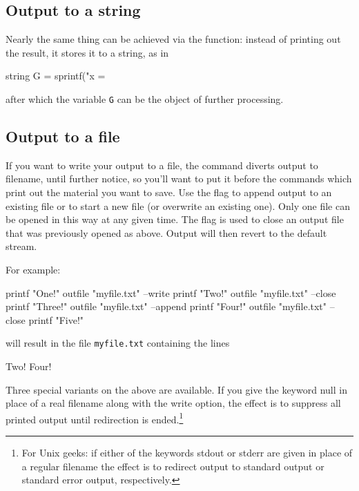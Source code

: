 \subsection{Output to a string}
\label{sec:sprintf}

Nearly the same thing can be achieved via the  function:
instead of printing out the result, it stores it to a string, as in 
\begin{code}
  string G = sprintf("x = %
\end{code}
after which the variable \texttt{G} can be the object of further
processing.


\subsection{Output to a file}
\label{sec:outfile}

If you want to write your output to a file, the  command
diverts output to filename, until further notice, so you'll want to
put it before the commands which print out the material you want to
save. Use the flag  to append output to an existing
file or  to start a new file (or overwrite an existing
one). Only one file can be opened in this way at any given time. The
 flag is used to close an output file that was
previously opened as above. Output will then revert to the default
stream.

For example:
\begin{code}
  printf "One!\n"
  outfile "myfile.txt" --write
  printf "Two!\n"
  outfile "myfile.txt" --close
  printf "Three!\n"
  outfile "myfile.txt" --append
  printf "Four!\n"
  outfile "myfile.txt" --close
  printf "Five!\n"
\end{code}
will result in the file \texttt{myfile.txt} containing the lines
\begin{code}
Two!
Four!  
\end{code}

Three special variants on the above are available. If you give the
keyword null in place of a real filename along with the write option,
the effect is to suppress all printed output until redirection is
ended.\footnote{For Unix geeks: if either of the keywords stdout or
  stderr are given in place of a regular filename the effect is to
  redirect output to standard output or standard error output,
  respectively.}

